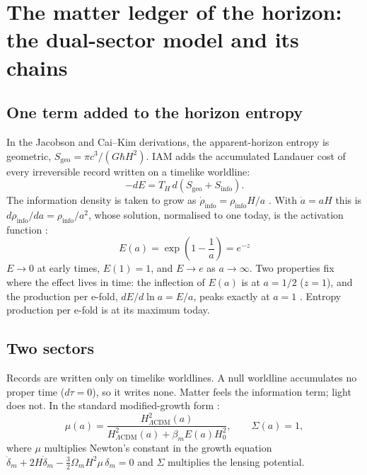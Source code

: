 \chapter{The matter ledger of the horizon: the dual-sector model and its chains}\label{ch:dual}

\section{One term added to the horizon entropy}

In the Jacobson and Cai--Kim derivations, the apparent-horizon entropy is geometric, $S_{\mathrm{geo}}=\pi c^3/(G\hbar H^2)$.
IAM adds the accumulated Landauer cost of every irreversible record written on a timelike worldline:
\begin{equation}
 -dE=T_H\,d\!\left(S_{\mathrm{geo}}+S_{\mathrm{info}}\right).
\end{equation}
The information density is taken to grow as $\dot\rho_{\mathrm{info}}=\rho_{\mathrm{info}}H/a$ \conjecture. With $\dot a=aH$ this is
$d\rho_{\mathrm{info}}/da=\rho_{\mathrm{info}}/a^2$, whose solution, normalised to one today, is the activation function \derived:
\begin{equation}
 \boxed{\;E(a)=\exp\!\left(1-\frac1a\right)=e^{-z}\;}
 \label{eq:Ea}
\end{equation}
$E\to0$ at early times, $E(1)=1$, and $E\to e$ as $a\to\infty$. Two properties fix where the effect lives in time:
the inflection of $E(a)$ is at $a=1/2$ ($z=1$), and the production per e-fold, $dE/d\ln a=E/a$, peaks exactly at $a=1$ \calc.
Entropy production per e-fold is at its maximum today.

\section{Two sectors}

Records are written only on timelike worldlines. A null worldline accumulates no proper time ($d\tau=0$), so it writes none.
Matter feels the information term; light does not. In the standard modified-growth form \derived:
\begin{equation}
 \mu(a)=\frac{H^2_{\Lambda\mathrm{CDM}}(a)}{H^2_{\Lambda\mathrm{CDM}}(a)+\beta_m E(a)H_0^2},\qquad \Sigma(a)=1,
 \label{eq:mu}
\end{equation}
where $\mu$ multiplies Newton's constant in the growth equation
$\ddot\delta_m+2H\dot\delta_m-\tfrac32\Omega_mH^2\mu\,\delta_m=0$ and $\Sigma$ multiplies the lensing potential.

